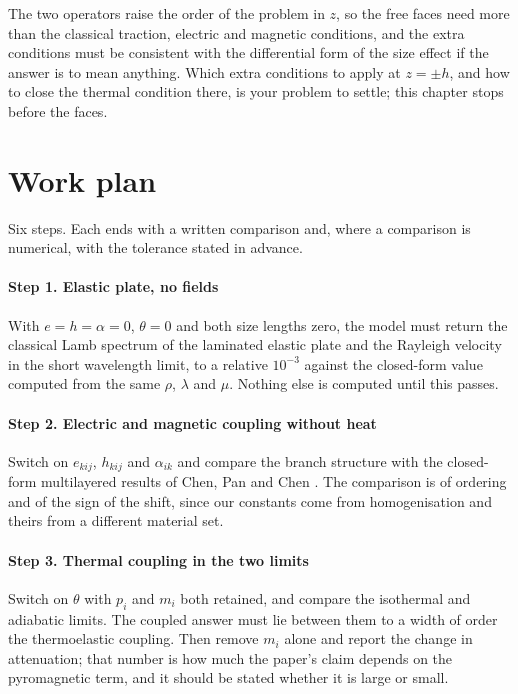 \documentclass[11pt]{article}
\begin{document}
The two operators raise the order of the problem in $z$, so the free faces need more than the classical
traction, electric and magnetic conditions, and the extra conditions must be consistent with the differential
form of the size effect if the answer is to mean anything. Which extra conditions to apply at $z=\pm h$,
and how to close the thermal condition there, is your problem to settle; this chapter stops before the
faces.

\section{Work plan}

Six steps. Each ends with a written comparison and, where a comparison is numerical, with the tolerance
stated in advance.

\paragraph{Step 1. Elastic plate, no fields} With $e=h=\alpha=0$, $\theta=0$ and both size lengths zero, the
model must return the classical Lamb spectrum of the laminated elastic plate and the Rayleigh velocity in
the short wavelength limit, to a relative $10^{-3}$ against the closed-form value computed from the same
$\rho$, $\lambda$ and $\mu$. Nothing else is computed until this passes.

\paragraph{Step 2. Electric and magnetic coupling without heat} Switch on $e_{kij}$, $h_{kij}$ and
$\alpha_{ik}$ and compare the branch structure with the closed-form multilayered results of Chen, Pan and
Chen \cite{Chen2007}. The comparison is of ordering and of the sign of the shift, since our constants come
from homogenisation and theirs from a different material set.

\paragraph{Step 3. Thermal coupling in the two limits} Switch on $\theta$ with $p_i$ and $m_i$ both retained,
and compare the isothermal and adiabatic limits. The coupled answer must lie between them to a width of order
the thermoelastic coupling. Then remove $m_i$ alone and report the change in attenuation; that number is how
much the paper's claim depends on the pyromagnetic term, and it should be stated whether it is large or
small.
\end{document}

